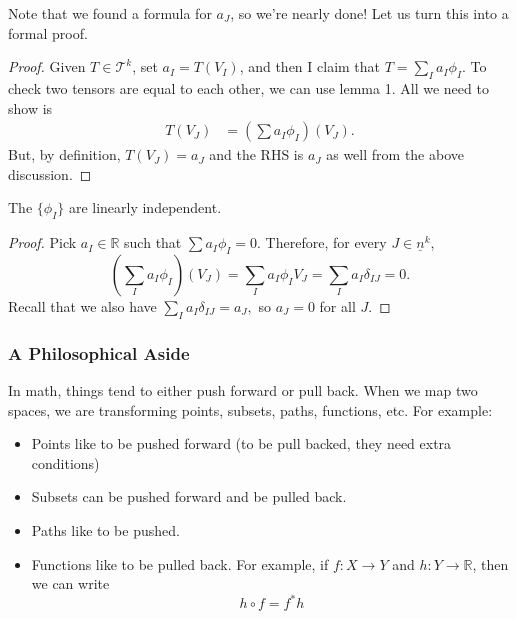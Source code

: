 \documentclass{article}
\numberwithin{equation}{section}
\begin{document}
Note that we found a formula for $a_J$, so we're nearly done! Let us turn this into a formal proof.
\begin{proof}
    Given $T\in \mathcal{T}^k$, set $a_I =  T(V_I)$, and then I claim that $T = \sum_I a_I\phi_I$. To check two tensors are equal to each other, we can use lemma 1. All we need to show is
    \begin{align*}
        T(V_J) &= \left(\sum a_I\phi_I\right)(V_J).
    \end{align*}
    But, by definition, $T(V_J)=a_J$ and the RHS is $a_J$ as well from the above discussion.
\end{proof}
\begin{lemma}
    The $\{\phi_I\}$ are linearly independent.
\end{lemma}
\begin{proof}
    Pick $a_I \in \mathbb{R}$ such that $\sum a_I\phi_I = 0.$ Therefore, for every $J\in \underline{n}^k$,
    \begin{equation}
        \left(\sum_I a_I \phi_I\right)(V_J) = \sum_I a_I \phi_I V_J = \sum_I a_I \delta_{IJ} = 0.
    \end{equation}
    Recall that we also have $\sum_I a_I \delta_{IJ} = a_J,$ so $a_J=0$ for all $J$.
\end{proof}
\subsubsection*{A Philosophical Aside}
In math, things tend to either push forward or pull back. When we map two spaces, we are transforming points, subsets, paths, functions, etc. For example:
\begin{itemize}
    \item Points like to be pushed forward (to be pull backed, they need extra conditions)
    \item Subsets can be pushed forward and be pulled back.
    \item Paths like to be pushed.
    \item Functions like to be pulled back. For example, if $f:X\to Y$ and $h:Y\to \mathbb{R}$, then we can write
    \begin{equation}
        h\circ f = f^* h
    \end{equation}
\end{itemize}
\end{document}
